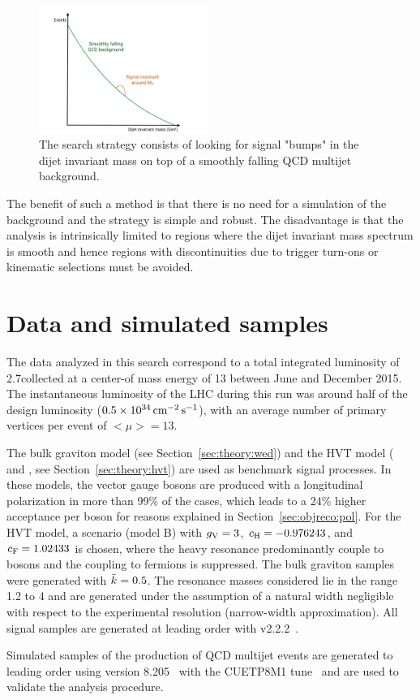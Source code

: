 \begin{figure}[h!] 
    \centering
    \includegraphics[width=0.49\textwidth]{figures/analysis/search1/misc/sigExtraction.pdf}
    \caption{The search strategy consists of looking for signal "bumps" in the dijet invariant mass on top of a smoothly falling QCD multijet background.}
    \label{fig:searchI:bumphunt}
\end{figure}
The benefit of such a method is that there is no need for a simulation of the background and the strategy is simple and robust. The disadvantage is that the analysis is intrinsically limited to regions where the dijet invariant mass spectrum is smooth and hence regions with discontinuities due to trigger turn-ons or kinematic selections must be avoided.

\section{Data and simulated samples}
\label{sec:searchI:samples}
The data analyzed in this search correspond to a total integrated luminosity of 2.7\fbinv collected at a center-of mass energy of 13 \TeV between June and December 2015. The instantaneous luminosity of the LHC during this run was around half of the design luminosity ($0.5 \times 10^{34} \,\text{cm}^\text{$-$2}\,\text{s}^\text{$-$1}$), with an average number of primary vertices per event of $<\mu>=13$. \par
The bulk graviton model (see Section~\ref{sec:theory:wed}) and the HVT model (\PWpr{} and \PZpr{}, see Section~\ref{sec:theory:hvt}) are used as benchmark signal processes. In these models, the vector gauge bosons are produced with a longitudinal polarization in more than 99\% of the cases, which leads to a 24\% higher acceptance per boson for reasons explained in Section~\ref{sec:objreco:pol}. For the HVT model, a scenario (model B) with $g_{\rm V}=3$, $c_{\rm H}=-0.976243$, and $c_{\rm F}=1.02433$ is chosen, where the heavy resonance predominantly couple to bosons and the coupling to fermions is suppressed. The bulk graviton samples were generated with $\tilde{k} = 0.5$. The resonance masses considered lie in the range 1.2 to 4 \TeV and are generated under the assumption of a natural width negligible with respect to the experimental resolution (narrow-width approximation). All signal samples are generated at leading order with \amcatnlo{} v2.2.2~\cite{Alwall:2014hca}. \par
Simulated samples of the production of QCD multijet events are generated to leading order using \PYTHIA version 8.205~\cite{Sjostrand:2007gs} with the CUETP8M1 tune~\cite{Khachatryan:2015pea} and are used to validate the analysis procedure.


